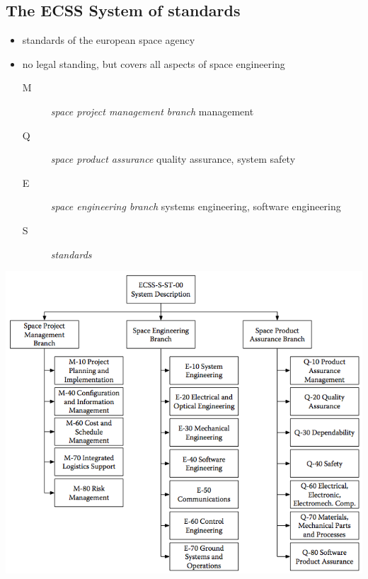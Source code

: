 \documentclass[a4paper, 10pt]{article}
\begin{document}
\subsection*{The ECSS System of standards}
\begin{itemize}
    \item standards of the european space agency
    \item no legal standing, but covers all aspects of space engineering
    \begin{description}
        \item[M] \emph{space project management branch} management
        \item[Q] \emph{space product assurance} quality assurance, system safety
        \item[E] \emph{space engineering branch} systems engineering, software engineering
        \item[S] \emph{standards}
    \end{description}
\end{itemize}
\begin{center}
    \includegraphics[width=.5\linewidth]{images/ecss.png}
\end{center}
\end{document}
